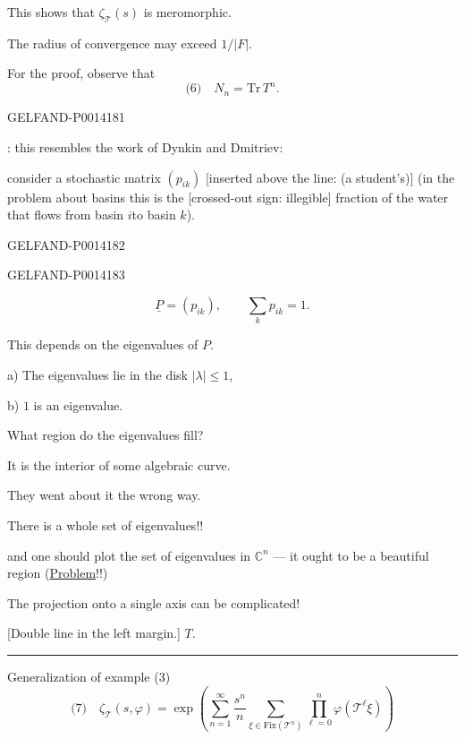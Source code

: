 This shows that \(\zeta_{\mathcal T}(s)\) is meromorphic.

The radius of convergence may exceed \(1/|F|\).

For the proof, observe that
\[
\text{(6)}\quad N_n=\mathrm{Tr}\,T^n.
\]


\begin{GelfandAdjacentEvidence}{GELFAND-P001418}{1}

: this resembles the work of Dynkin and Dmitriev:

consider a stochastic matrix \((p_{ik})\)
[inserted above the line: (a student’s)] (in the problem about basins this is the
[crossed-out sign: illegible] fraction of the water that flows from basin \(i\)to basin \(k\)).
\end{GelfandAdjacentEvidence}
\begin{GelfandAdjacentEvidence}{GELFAND-P001418}{2}

\end{GelfandAdjacentEvidence}
\begin{GelfandAdjacentEvidence}{GELFAND-P001418}{3}


\[
\underline{P}=(p_{ik}),\qquad \sum_k p_{ik}=1.
\]

This depends on the eigenvalues of \(P\).

a) The eigenvalues lie in the disk \(|\lambda|\leq1\),

b) \(1\) is an eigenvalue.

What region do the eigenvalues fill?

It is the interior of some algebraic curve.

They went about it the wrong way.

There is a whole set of eigenvalues!!

and one should plot the set of eigenvalues in \(\mathbb C^n\) — it ought to be a beautiful region (\uline{Problem}!!)

The projection onto a single axis can be complicated!

[Double line in the left margin.]
\quad \(T\).

\smallskip\hrule\smallskip

 Generalization of example (3)
\[
\text{(7)}\quad \zeta_{\mathcal T}(s,\varphi)=
 \exp\left(
 \sum_{n=1}^{\infty}\frac{s^n}{n}
 \sum_{\xi\in\mathrm{Fix}(\mathcal T^n)}
 \prod_{\ell=0}^{n}\varphi(\mathcal T^\ell\xi)
 \right)
\]
\end{GelfandAdjacentEvidence}
